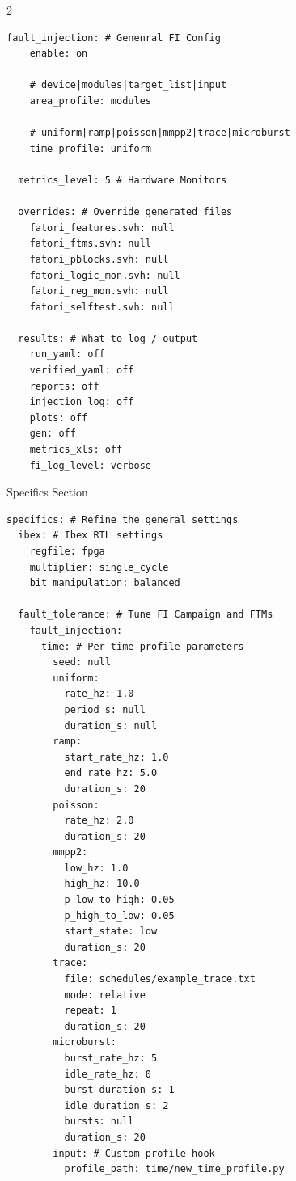 \begin{multicols}{2}
\begin{lstlisting}[language=simpleyaml,style=yamlcompact,breaklines=true,aboveskip=4pt,belowskip=6pt]
  fault_injection: # Genenral FI Config
    enable: on
    
    # device|modules|target_list|input
    area_profile: modules 
    
    # uniform|ramp|poisson|mmpp2|trace|microburst
    time_profile: uniform  

  metrics_level: 5 # Hardware Monitors

  overrides: # Override generated files
    fatori_features.svh: null
    fatori_ftms.svh: null
    fatori_pblocks.svh: null
    fatori_logic_mon.svh: null
    fatori_reg_mon.svh: null
    fatori_selftest.svh: null

  results: # What to log / output
    run_yaml: off
    verified_yaml: off
    reports: off
    injection_log: off
    plots: off
    gen: off
    metrics_xls: off
    fi_log_level: verbose
\end{lstlisting}

Specifics Section\par
\begin{lstlisting}[language=simpleyaml,style=yamlcompact,breaklines=true,aboveskip=4pt,belowskip=0pt]
specifics: # Refine the general settings
  ibex: # Ibex RTL settings
    regfile: fpga
    multiplier: single_cycle
    bit_manipulation: balanced

  fault_tolerance: # Tune FI Campaign and FTMs
    fault_injection:
      time: # Per time-profile parameters
        seed: null
        uniform:
          rate_hz: 1.0
          period_s: null
          duration_s: null
        ramp:
          start_rate_hz: 1.0
          end_rate_hz: 5.0
          duration_s: 20
        poisson:
          rate_hz: 2.0
          duration_s: 20
        mmpp2:
          low_hz: 1.0
          high_hz: 10.0
          p_low_to_high: 0.05
          p_high_to_low: 0.05
          start_state: low
          duration_s: 20
        trace:
          file: schedules/example_trace.txt
          mode: relative
          repeat: 1
          duration_s: 20
        microburst:
          burst_rate_hz: 5
          idle_rate_hz: 0
          burst_duration_s: 1
          idle_duration_s: 2
          bursts: null
          duration_s: 20
        input: # Custom profile hook
          profile_path: time/new_time_profile.py


\end{lstlisting}
\end{multicols}

